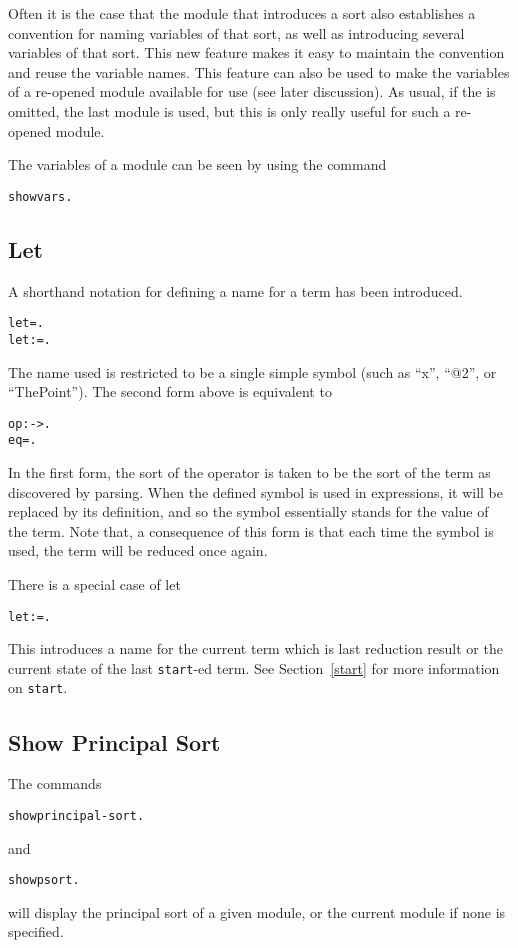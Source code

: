 Often it is the case that the module that introduces a sort also
establishes a convention for naming variables of that sort, as well as
introducing several variables of that sort.  This new feature makes it
easy to maintain the convention and reuse the variable names.  This
feature can also be used to make the variables of a re-opened module
available for use (see later discussion).  As usual, if the
 is omitted, the last module is used, but this is only
really useful for such a re-opened module.

The variables of a module can be seen by using the command
\begin{alltt}
        show vars \lopt {} \ropt .
\end{alltt}

\subsection{Let}
A shorthand notation for defining a name for a term has been
introduced.
\begin{alltt}
        let  =  .
        let  :  =  .
\end{alltt}
The name used is restricted to be a single simple symbol (such as
``x'', ``@2'', or ``ThePoint'').  The second form above is equivalent
to
\begin{alltt}
        op  : ->  .
        eq  =  .
\end{alltt}
In the first form, the sort of the operator is taken to be the sort of
the term as discovered by parsing.  When the defined symbol is used in
expressions, it will be replaced by its definition, and so the symbol
essentially stands for the value of the term.  Note that, a
consequence of this form is that each time the symbol is used, the
term will be reduced once again.

There is a special case of let
\begin{alltt}
        let  {\lopt}:  \ropt = .
\end{alltt}
\noi This introduces a name for the current term which is last
reduction result or the current state of the last {\tt start}-ed term.
See Section~\ref{start} for more information on {\tt start}.

\subsection{Show Principal Sort}
The commands
\begin{alltt}
        show principal-sort \lopt {} \ropt .
\end{alltt}
and
\begin{alltt}
        show psort  \lopt {} \ropt .
\end{alltt}
will display the principal sort of a given module, or the current
module if none is specified.

